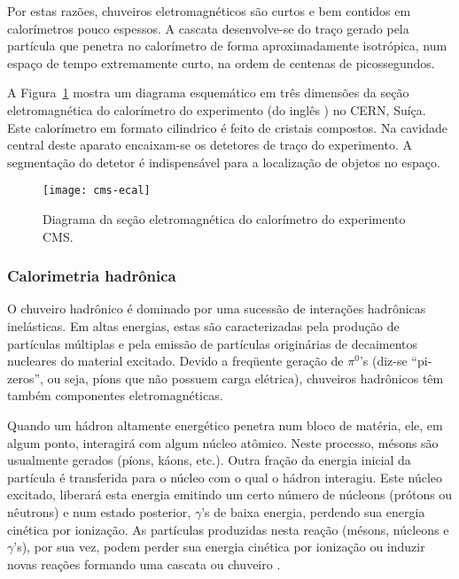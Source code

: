 Por estas razões, chuveiros eletromagnéticos são curtos e bem contidos em
calorímetros pouco espessos. A cascata desenvolve-se do traço gerado pela
par\-tí\-cu\-la que penetra no calorímetro de forma aproximadamente
isotrópica, num espaço de tempo extremamente curto, na ordem de centenas de
picossegundos.

A Figura~\ref{fig:cms-ecal} mostra um diagrama esquemático em três dimensões
da seção eletromagnética do calorímetro do experimento  (do inglês
) no CERN, Suíça. Este calorímetro em formato
cilindrico é feito de cristais compostos. Na cavidade central deste aparato
encaixam-se os detetores de traço do experimento. A segmentação do detetor é
indispensável para a localização de objetos no espaço.

\begin{figure}
\begin{center}
\texttt{[image: cms-ecal]}
\end{center}
\caption{Diagrama da seção eletromagnética do calorímetro do experimento CMS.}
\label{fig:cms-ecal}
\end{figure}

\subsubsection{Calorimetria hadrônica}
\label{sec:calohad}

O chuveiro hadrônico é dominado por uma sucessão de interações hadrônicas
inelásticas. Em altas energias, estas são caracterizadas pela produção de
partículas múltiplas e pela emissão de partículas originárias de decaimentos
nucleares do material excitado. Devido a freqüente geração de $\pi^{0}$'s
(diz-se ``pi-zeros'', ou seja, píons que não possuem carga elétrica),
chuveiros hadrônicos têm também componentes eletromagnéticas.

Quando um hádron altamente ener\-gé\-tico penetra num bloco de ma\-té\-ria,
ele, em algum ponto, interagi\-rá com algum nú\-cleo atômico. Neste processo,
mésons são usualmente gerados (píons, káons, etc.). Outra fração da energia
inicial da partícula é transferida para o núcleo com o qual o hádron
interagiu. Este núcleo excitado, liberará esta energia emitindo um certo
nú\-mero de nú\-cleons (prótons ou nêutrons) e num estado posterior,
$\gamma$'s de baixa energia, perdendo sua energia cinética por ionização. As
partículas produzidas nesta reação (mésons, núcleons e $\gamma$'s), por sua
vez, podem perder sua energia cinética por ionização ou induzir novas reações
formando uma cascata ou chuveiro \cite{hadcal}.

